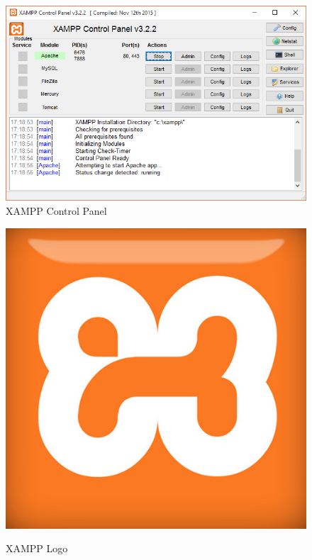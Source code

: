 	
	\begin{figure}[h]
		\centering
		\includegraphics[scale=.8]{figures/xampp_gui.png}
		\caption{XAMPP Control Panel}
		\label{XAMPP_GUI}
	\end{figure}

	\begin{figure}
		\vspace{-1cm}
		\begin{center}
			\caption{XAMPP Logo}
			\vspace{.5cm}
			\includegraphics[scale=.2]{figures/xampp_logo.jpg}
			
			\label{XAMPP_Logo}
		\end{center}
	\end{figure}

